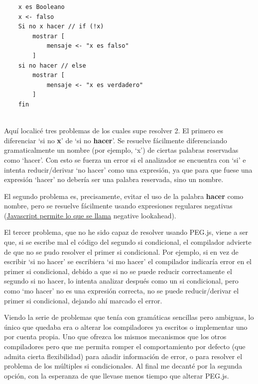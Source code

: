 \documentclass{report}
\begin{document}
	\begin{BVerbatim}
	x es Booleano
	x <- falso
	Si no x hacer // if (!x)
		mostrar [
			mensaje <- "x es falso"
		]
	si no hacer // else
		mostrar [
			mensaje <- "x es verdadero"
		]
	fin
	\end{BVerbatim}
	\\
	
	Aquí localicé tres problemas de los cuales supe resolver 2. El primero es diferenciar `si no \textbf{x}' de `si no \textbf{hacer}'. Se resuelve fácilmente diferenciando gramaticalmente un nombre (por ejemplo, `x') de ciertas palabras reservadas como `hacer'. Con esto se fuerza un error si el analizador se encuentra con `si' e intenta reducir/derivar `no hacer' como una expresión, ya que para que fuese una expresión `hacer' no debería ser una palabra reservada, sino un nombre.
	
	\vspace{10px}
	
	El segundo problema es, precisamente, evitar el uso de la palabra \textbf{hacer} como nombre, pero se resuelve fácilmente usando expresiones regulares negativas (\hyperref[app:c]{Javascript permite lo que se llama} negative lookahead\cite{lookahead}). 
	
	\vspace{10px}
	
	El tercer problema, que no he sido capaz de resolver usando PEG.js, viene a ser que, si se escribe mal el código del segundo si condicional, el compilador advierte de que no se pudo resolver el primer si condicional. Por ejemplo, si en vez de escribir `si no hacer' se escribiera `si mo hacer' el compilador indicaría error en el primer si condicional, debido a que si no se puede reducir correctamente el segundo si no hacer, lo intenta analizar después como un si condicional, pero como `mo hacer' no es una expresión correcta, no se puede reducir/derivar el primer si condicional, dejando ahí marcado el error.
	
	\vspace{10px}
	
	Viendo la serie de problemas que tenía con gramáticas sencillas pero ambiguas, lo único que quedaba era o alterar los compiladores ya escritos o implementar uno por cuenta propia. Uno que ofrezca los mismos mecanismos que los otros compiladores pero que me permita romper el comportamiento por defecto (que admita cierta flexibilidad) para añadir información de error, o para resolver el problema de los múltiples si condicionales. Al final me decanté por la segunda opción, con la esperanza de que llevase menos tiempo que alterar PEG.js.
	
\end{document}
